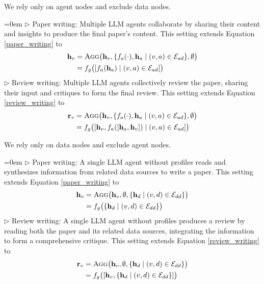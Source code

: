 We rely only on agent nodes and exclude data nodes.

\hangindent=0em
$\triangleright$ Paper writing: Multiple LLM agents collaborate by sharing their content and insights to produce the final paper’s content. 
This setting extends Equation \ref{paper_writing} to
\begin{equation} \begin{split} \mathbf{h}_{v} & = \textsc{Agg}\big( \mathbf{h}_v, \{f_a(\cdot), \mathbf{h}_a \mid (v,a) \in \mathcal{E}_{ad}\}, \emptyset\big) \\ & = f_g\bigl([{f_a(\mathbf{h}_a) \mid (v,a) \in \mathcal{E}_{ad}}]\bigr) \end{split} \label{paper_writing_agentagg} \end{equation}
$\triangleright$ Review writing: Multiple LLM agents collectively review the paper, sharing their input and critiques to form the final review. 
This setting extends Equation \ref{review_writing} to
\begin{equation} \begin{split} \mathbf{r}_{v} & = \textsc{Agg}\big( \mathbf{h}_v, \{f_a(\cdot), \mathbf{h}_a \mid (v,a) \in \mathcal{E}_{ad}\}, \emptyset\big) \\ & = f_g\bigl([\mathbf{h}_v, {f_a([\mathbf{h}_a, \mathbf{h}_v]) \mid (v,a) \in \mathcal{E}_{ad}}]\bigr) \end{split} \label{review_writing_agentagg} \end{equation}

We rely only on data nodes and exclude agent nodes.

\hangindent=0em
$\triangleright$ Paper writing: A single LLM agent without profiles reads and synthesizes information from related data sources to write a paper. 
This setting extends Equation \ref{paper_writing} to
\begin{equation} \begin{split} \mathbf{h}_{v} & = \textsc{Agg}\big( \mathbf{h}_v, \emptyset, \{\mathbf{h}_d \mid (v,d) \in \mathcal{E}_{dd}\}\big) \\ & = f_g\bigl(\{\mathbf{h}_d \mid (v,d) \in \mathcal{E}_{dd}\}\bigr) \end{split} \label{paper_writing_dataagg} \end{equation}
$\triangleright$ Review writing: A single LLM agent without profiles produces a review by reading both the paper and its related data sources, integrating the information to form a comprehensive critique.
This setting extends Equation \ref{review_writing} to
 \begin{equation} \begin{split} \mathbf{r}_{v} & = \textsc{Agg}\big( \mathbf{h}_v, \emptyset, \{\mathbf{h}_d \mid (v,d) \in \mathcal{E}_{dd}\}\big)\\ & = f_g\bigl([\mathbf{h}_v, \{\mathbf{h}_d \mid (v,d) \in \mathcal{E}_{dd}\}]\bigr) \end{split} \label{review_writing_dataagg} \end{equation}

